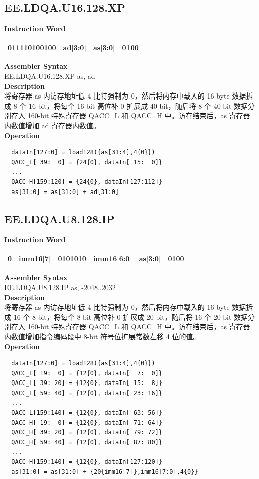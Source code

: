 \clearpage
\subsection{EE.LDQA.U16.128.XP}\label{instruction:EELDQAU16128XP}
\setlength\tabcolsep{6pt}
\textbf{Instruction Word} \\
\begin{tabular}{|c|c|c|c|}
	\hline
	011110100100 & ad[3:0] & as[3:0] & 0100 \\
	\hline
\end{tabular}

\textbf{Assembler Syntax} \\
EE.LDQA.U16.128.XP as, ad \\
\textbf{Description} \\
将寄存器 as 内访存地址低 4 比特强制为 0，然后将内存中载入的 16-byte 数据拆成 8 个 16-bit，将每个 16-bit 高位补 0 扩展成 40-bit，随后将 8 个 40-bit 数据分别存入 160-bit 特殊寄存器 QACC\_L 和 QACC\_H 中。访存结束后，as 寄存器内数值增加 ad 寄存器内数值。\\
\textbf{Operation}
\begin{lstlisting}
  dataIn[127:0] = load128({as[31:4],4{0}})
  QACC_L[ 39:  0] = {24{0}, dataIn[ 15:  0]}
  ...
  QACC_H[159:120] = {24{0}, dataIn[127:112]}
  as[31:0] = as[31:0] + ad[31:0]
\end{lstlisting}

\clearpage
\subsection{EE.LDQA.U8.128.IP}\label{instruction:EELDQAU8128IP}
\setlength\tabcolsep{6pt}
\textbf{Instruction Word} \\
\begin{tabular}{|c|c|c|c|c|c|}
	\hline
	0 & imm16[7] & 0101010 & imm16[6:0] & as[3:0] & 0100 \\
	\hline
\end{tabular}

\textbf{Assembler Syntax} \\
EE.LDQA.U8.128.IP as, -2048..2032 \\
\textbf{Description} \\
将寄存器 as 内访存地址低 4 比特强制为 0，然后将内存中载入的 16-byte 数据拆成 16 个 8-bit，将每个 8-bit 高位补 0 扩展成 20-bit，随后将 16 个 20-bit 数据分别存入 160-bit 特殊寄存器 QACC\_L 和 QACC\_H 中。访存结束后，as 寄存器内数值增加指令编码段中 8-bit 符号位扩展常数左移 4 位的值。\\
\textbf{Operation}
\begin{lstlisting}
  dataIn[127:0] = load128({as[31:4],4{0}})
  QACC_L[ 19:  0] = {12{0}, dataIn[  7:  0]}
  QACC_L[ 39: 20] = {12{0}, dataIn[ 15:  8]}
  QACC_L[ 59: 40] = {12{0}, dataIn[ 23: 16]}
  ...
  QACC_L[159:140] = {12{0}, dataIn[ 63: 56]}
  QACC_H[ 19:  0] = {12{0}, dataIn[ 71: 64]}
  QACC_H[ 39: 20] = {12{0}, dataIn[ 79: 72]}
  QACC_H[ 59: 40] = {12{0}, dataIn[ 87: 80]}
  ...
  QACC_H[159:140] = {12{0}, dataIn[127:120]}
  as[31:0] = as[31:0] + {20{imm16[7]},imm16[7:0],4{0}}
\end{lstlisting}

